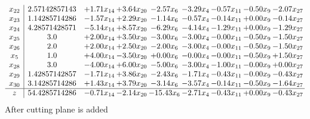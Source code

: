 \documentclass[8pt]{article}
\begin{document}
\[\begin{array}{c| c c@{\hskip 2pt} c@{\hskip 2pt} c@{\hskip 2pt} c@{\hskip 2pt} c@{\hskip 2pt} c@{\hskip 2pt} c@{\hskip 2pt} }
 x_{22}   &  2.57142857143 & +  1.71 x_{14} & +  3.64 x_{20} & -2.57 x_{6} & -3.29 x_{4} & -0.57 x_{11} & -0.50 x_{9} & -2.07 x_{27}\\
 x_{23}   &  1.14285714286 & -1.57 x_{14} & +  2.29 x_{20} & -1.14 x_{6} & -0.57 x_{4} & -0.14 x_{11} & +  0.00 x_{9} & -0.14 x_{27}\\
 x_{24}   &  4.28571428571 & -5.14 x_{14} & +  8.57 x_{20} & -6.29 x_{6} & -4.14 x_{4} & -1.29 x_{11} & +  0.00 x_{9} & -1.29 x_{27}\\
 x_{25}   &  3.0 & +  2.00 x_{14} & +  3.50 x_{20} & -3.00 x_{6} & -3.00 x_{4} & -0.00 x_{11} & -0.50 x_{9} & -1.50 x_{27}\\
 x_{26}   &  2.0 & +  2.00 x_{14} & +  2.50 x_{20} & -2.00 x_{6} & -3.00 x_{4} & -0.00 x_{11} & -0.50 x_{9} & -1.50 x_{27}\\
 x_{5}   &  1.0 & +  4.00 x_{14} & -3.50 x_{20} & +  0.00 x_{6} & -0.00 x_{4} & -0.00 x_{11} & -0.50 x_{9} & +  1.50 x_{27}\\
 x_{28}   &  3.0 & -4.00 x_{14} & +  6.00 x_{20} & -5.00 x_{6} & -3.00 x_{4} & -1.00 x_{11} & -0.00 x_{9} & +  0.00 x_{27}\\
 x_{29}   &  1.42857142857 & -1.71 x_{14} & +  3.86 x_{20} & -2.43 x_{6} & -1.71 x_{4} & -0.43 x_{11} & -0.00 x_{9} & -0.43 x_{27}\\
 x_{30}   &  3.14285714286 & +  1.43 x_{14} & +  3.79 x_{20} & -3.14 x_{6} & -3.57 x_{4} & -0.14 x_{11} & -0.50 x_{9} & -1.64 x_{27}\\
\hline
z    &  54.4285714286 & -0.71 x_{14} & -2.14 x_{20} & -15.43 x_{6} & -2.71 x_{4} & -0.43 x_{11} & +  0.00 x_{9} & -0.43 x_{27}\\
\end{array}\]
 After cutting plane is added 
\end{document}
